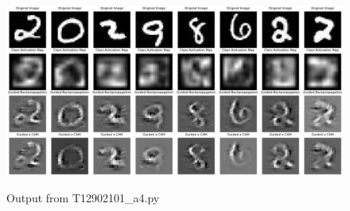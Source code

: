 \documentclass[12pt]{article}
\begin{document}
\begin{figure}[h]
\centering
\includegraphics[width=1\linewidth]{../output_pre.png}
\label{fig:output}
\caption{Output from T12902101\_a4.py}
\end{figure}
\end{document}
